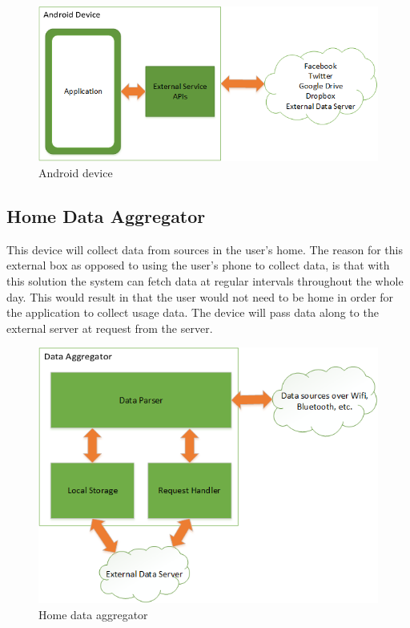 \begin{figure}[H]
\includegraphics[width=\textwidth]{ch/projectPlan/fig/androidDevice.png}
\caption{Android device}
\end{figure}

\subsection{Home Data Aggregator}
This device will collect data from sources in the user's home. The reason for this external box as opposed to using 
the user's phone to collect data, is that with this solution the system can fetch data at regular intervals throughout 
the whole day. This would result in that the user would not need to be home in order for the application to collect 
usage data. The device will pass data along to the external server at request from the server.

\begin{figure}[H]
\includegraphics[width=\textwidth]{ch/projectPlan/fig/home.png}
\caption{Home data aggregator}
\end{figure}
